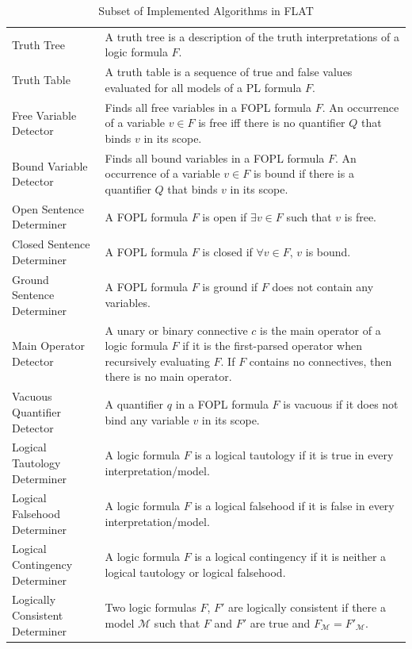 \documentclass[ms]{uncgdissertationexp2}
\theoremstyle{plain}
\theoremstyle{definition}
\theoremstyle{remark}
\begin{document}
\begin{table}\label{table:flat}
	\caption{Subset of Implemented Algorithms in FLAT}
	\small
	\begin{tabular}{p{3cm}p{11cm}}
	  \toprule
	  \thead{Algorithm}&\thead{Definition}\\
	  \midrule
	  Truth Tree&A truth tree is a description of the truth interpretations of a logic formula $F$.\\
	  Truth Table&A truth table is a sequence of true and false values evaluated for all models of a PL formula $F$.\\
	  Free Variable Detector&Finds all free variables in a FOPL formula $F$. An occurrence of a variable $v \in F$ is free iff there is no quantifier $Q$ that binds $v$ in its scope.\\
	  Bound Variable Detector&Finds all bound variables in a FOPL formula $F$. An occurrence of a variable $v \in F$ is bound if there is a quantifier $Q$ that binds $v$ in its scope.\\
	  Open Sentence Determiner&A FOPL formula $F$ is open if $\exists{v} \in F$ such that $v$ is free.\\
	  Closed Sentence Determiner&A FOPL formula $F$ is closed if $\forall{v} \in F$, $v$ is bound.\\
	  Ground Sentence Determiner&A FOPL formula $F$ is ground if $F$ does not contain any variables.\\
	  Main Operator Detector&A unary or binary connective $c$ is the main operator of a logic formula $F$ if it is the first-parsed operator when recursively evaluating $F$. If $F$ contains no connectives, then there is no main operator.\\
	  Vacuous Quantifier Detector&A quantifier $q$ in a FOPL formula $F$ is vacuous if it does not bind any variable $v$ in its scope.\\
	  Logical Tautology Determiner&A logic formula $F$ is a logical tautology if it is true in every interpretation/model.\\
	  Logical Falsehood Determiner&A logic formula $F$ is a logical falsehood if it is false in every interpretation/model.\\
	  Logical Contingency Determiner&A logic formula $F$ is a logical contingency if it is neither a logical tautology or logical falsehood.\\
	  Logically Consistent Determiner&Two logic formulas $F$, $F'$ are logically consistent if there a model $\mathcal{M}$ such that $F$ and $F'$ are true and $F_{\mathcal{M}} = F'_{\mathcal{M}}.$\\

\end{tabular}
\end{table}
\end{document}
